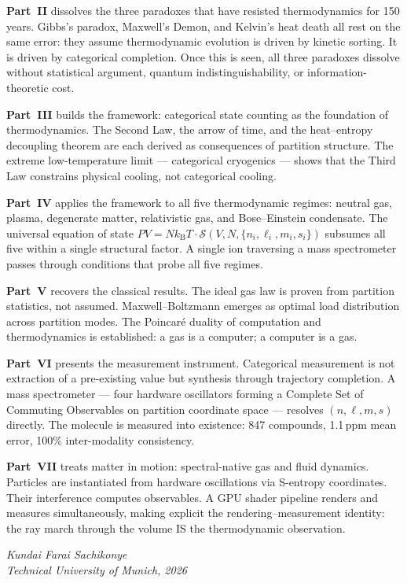 \textbf{Part~II} dissolves the three paradoxes that have resisted thermodynamics for 150 years. Gibbs's paradox, Maxwell's Demon, and Kelvin's heat death all rest on the same error: they assume thermodynamic evolution is driven by kinetic sorting. It is driven by categorical completion. Once this is seen, all three paradoxes dissolve without statistical argument, quantum indistinguishability, or information-theoretic cost.

\textbf{Part~III} builds the framework: categorical state counting as the foundation of thermodynamics. The Second Law, the arrow of time, and the heat--entropy decoupling theorem are each derived as consequences of partition structure. The extreme low-temperature limit — categorical cryogenics — shows that the Third Law constrains physical cooling, not categorical cooling.

\textbf{Part~IV} applies the framework to all five thermodynamic regimes: neutral gas, plasma, degenerate matter, relativistic gas, and Bose--Einstein condensate. The universal equation of state $PV = Nk_{\mathrm{B}}T \cdot \mathcal{S}(V,N,\{n_i,\ell_i,m_i,s_i\})$ subsumes all five within a single structural factor. A single ion traversing a mass spectrometer passes through conditions that probe all five regimes.

\textbf{Part~V} recovers the classical results. The ideal gas law is proven from partition statistics, not assumed. Maxwell--Boltzmann emerges as optimal load distribution across partition modes. The Poincaré duality of computation and thermodynamics is established: a gas is a computer; a computer is a gas.

\textbf{Part~VI} presents the measurement instrument. Categorical measurement is not extraction of a pre-existing value but synthesis through trajectory completion. A mass spectrometer — four hardware oscillators forming a Complete Set of Commuting Observables on partition coordinate space — resolves $(n,\ell,m,s)$ directly. The molecule is measured into existence: 847 compounds, 1.1\,ppm mean error, 100\% inter-modality consistency.

\textbf{Part~VII} treats matter in motion: spectral-native gas and fluid dynamics. Particles are instantiated from hardware oscillations via S-entropy coordinates. Their interference computes observables. A GPU shader pipeline renders and measures simultaneously, making explicit the rendering--measurement identity: the ray march through the volume IS the thermodynamic observation.

\bigskip

\noindent\textit{Kundai Farai Sachikonye}\\
\textit{Technical University of Munich, 2026}
